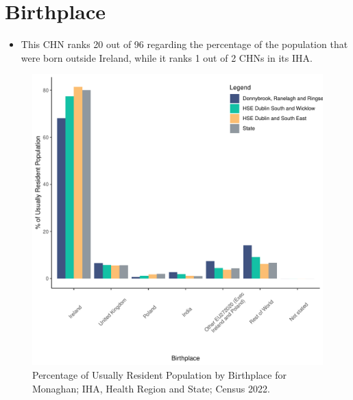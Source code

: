 \documentclass{article}
\begin{document}
\section{Birthplace}\label{sect:Birth}
\begin{itemize}
\item This CHN ranks  20 out of 96 regarding the percentage of the population that were born outside Ireland, while it ranks  1 out of 2 CHNs in its IHA.
\end{itemize}
\begin{figure}[H]
	\centering
	\includegraphics[width = 130mm]{../figures/BirthED.pdf}
	\caption{Percentage of Usually Resident Population by Birthplace for Monaghan; IHA, Health Region and State; Census 2022.}
	\label{fig:vbnv}
	\end{figure}
	
\end{document}
